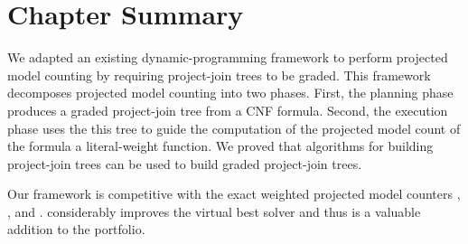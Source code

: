 \section{Chapter Summary}
\label{sec_procount_discussion}

We adapted an existing dynamic-programming framework \cite{dudek2020dpmc} to perform projected model counting by requiring project-join trees to be graded.
This framework decomposes projected model counting into two phases.
First, the planning phase produces a graded project-join tree from a CNF formula.
Second, the execution phase uses the this tree to guide the computation of the projected model count of the formula \wrt{} a literal-weight function. 
We proved that algorithms for building project-join trees can be used to build graded project-join trees.

Our framework \procount{} is competitive with the exact weighted projected model counters \dfp{} \cite{lagniez2019recursive}, \projmc{} \cite{lagniez2019recursive}, and \ssat{} \cite{lee2017solving}. 
\procount{} considerably improves the virtual best solver and thus is a valuable addition to the portfolio.
